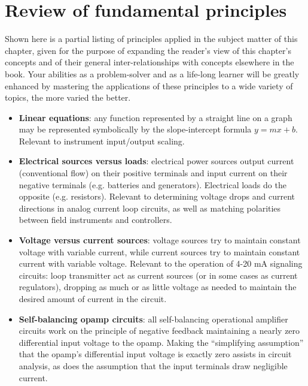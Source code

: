 \filbreak
\section{Review of fundamental principles}

Shown here is a partial listing of principles applied in the subject matter of this chapter, given for the purpose of expanding the reader's view of this chapter's concepts and of their general inter-relationships with concepts elsewhere in the book.  Your abilities as a problem-solver and as a life-long learner will be greatly enhanced by mastering the applications of these principles to a wide variety of topics, the more varied the better.

\begin{itemize}
\item \textbf{Linear equations}: any function represented by a straight line on a graph may be represented symbolically by the slope-intercept formula $y = mx + b$.  Relevant to instrument input/output scaling.
\item \textbf{Electrical sources versus loads}: electrical power sources output current (conventional flow) on their positive terminals and input current on their negative terminals (e.g. batteries and generators).  Electrical loads do the opposite (e.g. resistors).  Relevant to determining voltage drops and current directions in analog current loop circuits, as well as matching polarities between field instruments and controllers.
\item \textbf{Voltage versus current sources}: voltage sources try to maintain constant voltage with variable current, while current sources try to maintain constant current with variable voltage.  Relevant to the operation of 4-20 mA signaling circuits: loop transmitter act as current sources (or in some cases as current regulators), dropping as much or as little voltage as needed to maintain the desired amount of current in the circuit.
\item \textbf{Self-balancing opamp circuits}: all self-balancing operational amplifier circuits work on the principle of negative feedback maintaining a nearly zero differential input voltage to the opamp.  Making the ``simplifying assumption'' that the opamp's differential input voltage is exactly zero assists in circuit analysis, as does the assumption that the input terminals draw negligible current.
\end{itemize}







